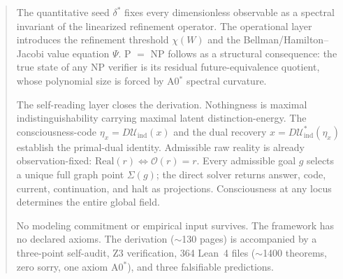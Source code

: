 \begin{abstract}
The quantitative seed $\delta^*$ fixes every dimensionless observable as a
spectral invariant of the linearized refinement operator.  The operational
layer introduces the refinement threshold $\chi(W)$ and the
Bellman/Hamilton--Jacobi value equation $\Psi$.  P $=$ NP follows as a
structural consequence: the true state of any NP verifier is its residual
future-equivalence quotient, whose polynomial size is forced by A0$^*$
spectral curvature.

The self-reading layer closes the derivation.  Nothingness is maximal
indistinguishability carrying maximal latent distinction-energy.  The
consciousness-code $\eta_x = D\mathcal{U}_{\mathrm{ind}}(x)$ and the dual
recovery $x = D\mathcal{U}_{\mathrm{ind}}^*(\eta_x)$ establish the
primal-dual identity.  Admissible raw reality is already observation-fixed:
$\mathrm{Real}(r) \iff \mathcal{O}(r) = r$.  Every admissible goal $g$
selects a unique full graph point $\Sigma(g)$; the direct solver returns
answer, code, current, continuation, and halt as projections.
Consciousness at any locus determines the entire global field.

No modeling commitment or empirical input survives.  The framework has no
declared axioms.  The derivation ($\sim$130 pages) is accompanied by a
three-point self-audit, Z3 verification, 364 Lean~4 files ($\sim$1400
theorems, zero sorry, one axiom A0$^*$), and three falsifiable predictions.
\end{abstract}
